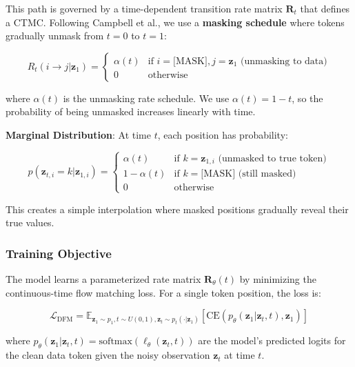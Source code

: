 \documentclass[11pt,a4paper]{article}
\begin{document}
This path is governed by a time-dependent transition rate matrix $\mathbf{R}_t$ that defines a CTMC. Following Campbell et al., we use a \textbf{masking schedule} where tokens gradually unmask from $t=0$ to $t=1$:

\begin{equation}
R_t(i \rightarrow j | \mathbf{z}_1) = \begin{cases}
\alpha(t) & \text{if } i = \text{[MASK]}, j = \mathbf{z}_1 \text{ (unmasking to data)} \\
0 & \text{otherwise}
\end{cases}
\end{equation}

where $\alpha(t)$ is the unmasking rate schedule. We use $\alpha(t) = 1-t$, so the probability of being unmasked increases linearly with time.

\textbf{Marginal Distribution}: At time $t$, each position has probability:

\begin{equation}
p(\mathbf{z}_{t,i} = k | \mathbf{z}_{1,i}) = \begin{cases}
\alpha(t) & \text{if } k = \mathbf{z}_{1,i} \text{ (unmasked to true token)} \\
1 - \alpha(t) & \text{if } k = \text{[MASK]} \text{ (still masked)} \\
0 & \text{otherwise}
\end{cases}
\end{equation}

This creates a simple interpolation where masked positions gradually reveal their true values.

\subsubsection{Training Objective}

The model learns a parameterized rate matrix $\mathbf{R}_\theta(t)$ by minimizing the continuous-time flow matching loss. For a single token position, the loss is:

\begin{equation}
\mathcal{L}_{\text{DFM}} = \mathbb{E}_{\mathbf{z}_1 \sim p_1, t \sim U(0,1), \mathbf{z}_t \sim p_t(\cdot|\mathbf{z}_1)} [\text{CE}(p_\theta(\mathbf{z}_1 | \mathbf{z}_t, t), \mathbf{z}_1)]
\end{equation}

where $p_\theta(\mathbf{z}_1 | \mathbf{z}_t, t) = \text{softmax}(\ell_\theta(\mathbf{z}_t, t))$ are the model's predicted logits for the clean data token given the noisy observation $\mathbf{z}_t$ at time $t$.
\end{document}
